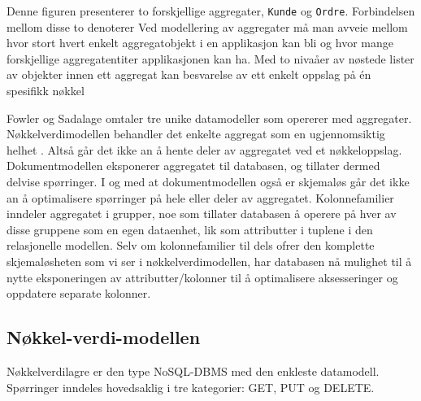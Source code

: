 Denne figuren  presenterer to forskjellige aggregater, \texttt{Kunde} og \texttt{Ordre}. Forbindelsen mellom disse to denoterer 
Ved modellering av aggregater må man avveie mellom hvor stort hvert enkelt aggregatobjekt i en applikasjon kan bli og hvor mange forskjellige aggregatentiter applikasjonen kan ha. Med to nivaåer av nøstede lister av objekter innen ett aggregat kan besvarelse av ett enkelt oppslag på én spesifikk nøkkel 

Fowler og Sadalage omtaler tre unike datamodeller som opererer med aggregater. Nøkkelverdimodellen behandler det enkelte aggregat som en ugjennomsiktig helhet \citep{sadalage2013}. Altså går det ikke an å hente deler av aggregatet ved et nøkkeloppslag. Dokumentmodellen eksponerer aggregatet til databasen, og tillater dermed delvise spørringer. I og med at dokumentmodellen også er skjemaløs går det ikke an å optimalisere spørringer på hele eller deler av aggregatet. Kolonnefamilier inndeler aggregatet i grupper, noe som tillater databasen å operere på hver av disse gruppene som en egen dataenhet, lik som attributter i tuplene i den relasjonelle modellen. Selv om kolonnefamilier til dels ofrer den komplette skjemaløsheten som vi ser i nøkkelverdimodellen, har databasen nå mulighet til å nytte eksponeringen av attributter/kolonner til å optimalisere aksesseringer og oppdatere separate kolonner.

\subsection{Nøkkel-verdi-modellen}

Nøkkelverdilagre er den type NoSQL-DBMS med den enkleste datamodell. Spørringer inndeles hovedsaklig i tre kategorier: GET, PUT og DELETE. 
